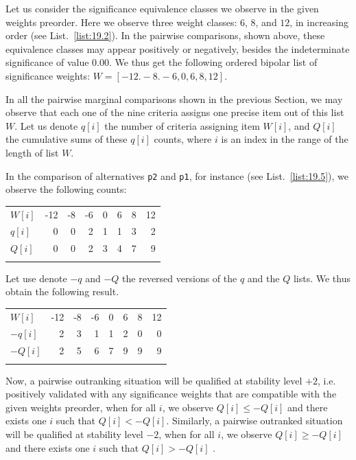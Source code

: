 Let us consider the significance equivalence classes we observe in the given weights preorder. Here we observe three weight classes: $6$, $8$, and $12$, in increasing order (see List.~\vref{list:19.2}). In the pairwise comparisons, shown above, these equivalence classes may appear positively or negatively, besides the indeterminate significance of value $0.00$. We thus get the following ordered bipolar list of significance weights: $W = [-12. -8. -6, 0, 6, 8, 12]$.

In all the pairwise marginal comparisons shown in the previous Section, we may observe that each one of the nine criteria assigns one precise item out of this list $W$. Let us denote $q[i]$ the number of criteria assigning item $W[i]$, and $Q[i]$ the cumulative sums of these $q[i]$ counts, where $i$ is an index in the range of the length of list $W$.

In the comparison of alternatives \texttt{p2} and \texttt{p1}, for instance (see List.~\vref{list:19.5}), we observe the following counts: \hfill
\begin{center}
\begin{tabular}{l|r|r|r|r|r|r|r}
 \svhline\noalign{\smallskip}
  $W[i]$ & -12 & -8  & -6  &  0  &  6  &  8 &  12\\  
 \noalign{\smallskip}\hline\noalign{\smallskip}
$q[i]$  &  0 &  0 &   2 &   1  &  1  &  3  &  2 \\
$Q[i]$  &  0 &  0 &   2 &   3  &  4  &  7  &  9 \\
      \noalign{\smallskip}\hline
\end{tabular}
\end{center}

\noindent Let use denote $-q$ and $-Q$ the reversed versions of the $q$ and the $Q$ lists. We thus obtain the following result.\hfill
\begin{center}
\begin{tabular}{l|r|r|r|r|r|r|r}
 \svhline\noalign{\smallskip}
  $W[i]$ & -12 & -8  & -6  &  0  &  6  &  8 &  12\\  
 \noalign{\smallskip}\hline\noalign{\smallskip}
  $-q[i]$  &  2 &  3 &   1 &   1  &  2  &  0  &  0 \\
  $-Q[i]$  &  2 &  5 &   6 &   7  &  9  &  9  &  9 \\
 \noalign{\smallskip}\hline
\end{tabular}
\end{center}

Now, a pairwise outranking situation will be qualified at stability level $+2$, i.e. positively validated with any significance weights that are compatible with the given weights preorder, when for all $i$, we observe $Q[i] \leq -Q[i]$ and there exists one $i$ such that $Q[i] < -Q[i]$. Similarly, a pairwise outranked situation will be qualified at stability level $-2$, when for all $i$, we observe $Q[i] \geq -Q[i]$ and there exists one $i$ such that $Q[i] > -Q[i]$ \citep{BIS-2004c}.

